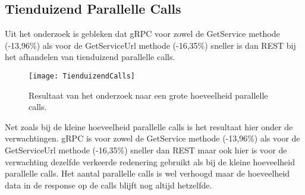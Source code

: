 \subsection{Tienduizend Parallelle Calls}
\label{subsec:Tienduizend parallelle calls}
Uit het onderzoek is gebleken dat gRPC voor zowel de GetService methode (-13,96\%) als voor de GetServiceUrl methode (-16,35\%) sneller is dan REST bij het afhandelen van tienduizend parallelle calls.
\begin{figure}[H]
    \centering
    \texttt{[image: TienduizendCalls]}
    \caption[Resultaten van tienduizend parallelle calls]{Resultaat van het onderzoek naar een grote hoeveelheid parallelle calls.}
    \label{fig:TienduizendCallsResult}
\end{figure}

Net zoals bij de kleine hoeveelheid parallelle calls is het resultaat hier onder de verwachtingen. gRPC is voor zowel de GetService methode (-13,96\%) als voor de GetServiceUrl methode (-16,35\%) sneller dan REST maar ook hier is voor de verwachting dezelfde verkeerde redenering gebruikt als bij de kleine hoeveelheid parallelle calls. Het aantal parallelle calls is wel verhoogd maar de hoeveelheid data in de response op de calls blijft nog altijd hetzelfde.


